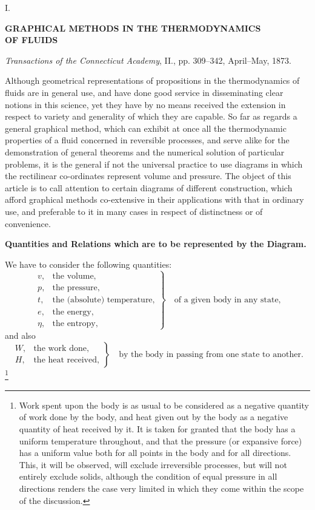\documentclass[11pt]{article}
\begin{document}
\begin{center}
{\large I.}\par\vspace{1.2em}
{\Large\bfseries GRAPHICAL METHODS IN THE THERMODYNAMICS\\ OF FLUIDS}\par\vspace{0.8em}
{\itshape Transactions of the Connecticut Academy}, II., pp. 309--342, April--May, 1873.
\end{center}

Although geometrical representations of propositions in the thermodynamics of fluids are in general use, and have done good service in disseminating clear notions in this science, yet they have by no means received the extension in respect to variety and generality of which they are capable. So far as regards a general graphical method, which can exhibit at once all the thermodynamic properties of a fluid concerned in reversible processes, and serve alike for the demonstration of general theorems and the numerical solution of particular problems, it is the general if not the universal practice to use diagrams in which the rectilinear co-ordinates represent volume and pressure. The object of this article is to call attention to certain diagrams of different construction, which afford graphical methods co-extensive in their applications with that in ordinary use, and preferable to it in many cases in respect of distinctness or of convenience.

\begin{center}
\bfseries Quantities and Relations which are to be represented by the Diagram.
\end{center}

We have to consider the following quantities:
\[
\left.
\begin{array}{ll}
v, & \text{the volume,}\\
p, & \text{the pressure,}\\
t, & \text{the (absolute) temperature,}\\
e, & \text{the energy,}\\
\eta, & \text{the entropy,}
\end{array}
\right\}\quad\text{of a given body in any state,}
\]
and also
\[
\left.
\begin{array}{ll}
W, & \text{the work done,}\\
H, & \text{the heat received,}
\end{array}
\right\}\quad\text{by the body in passing from one state to another.}
\]
\footnote{Work spent upon the body is as usual to be considered as a negative quantity of work done by the body, and heat given out by the body as a negative quantity of heat received by it. It is taken for granted that the body has a uniform temperature throughout, and that the pressure (or expansive force) has a uniform value both for all points in the body and for all directions. This, it will be observed, will exclude irreversible processes, but will not entirely exclude solids, although the condition of equal pressure in all directions renders the case very limited in which they come within the scope of the discussion.}
\end{document}
